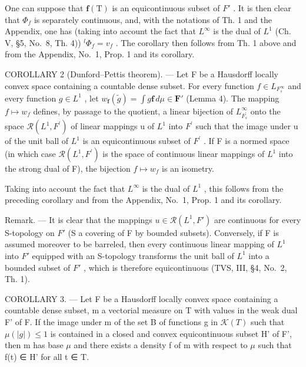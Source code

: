 One can suppose that \(\mathbf{f}(\mathrm{T})\) is an equicontinuous subset of \(F'\) . It is then clear that \(\Phi_{f}\) is separately continuous, and, with the notations of Th. 1 and the Appendix, one has (taking into account the fact that \(L^{\infty}\) is the dual of \(L^{1}\) (Ch. V, §5, No.~8, Th. 4)) \(^{l}\Phi_{f}=v_{f}\) . The corollary then follows from Th. 1 above and from the Appendix, No.~1, Prop. 1 and its corollary.

COROLLARY 2 (Dunford--Pettis theorem). --- Let F be a Hausdorff locally convex space containing a countable dense subset. For every function \(f \in L_{F_{s}^{\infty}}\) and every function \(g \in L^{1}\) , let \(w_{\mathbf{f}}(\widetilde{g}) = \int g\mathbf{f} \, d\mu \in \mathbf{F}'\) (Lemma 4). The mapping \(f \mapsto w_{f}\) defines, by passage to the quotient, a linear bijection of \(L_{F_{s}^{\prime}}^{\infty}\) onto the space \(\mathcal{R}(L^{1}, F^{\prime})\) of linear mappings u of \(L^{1}\) into \(F^{\prime}\) such that the image under u of the unit ball of \(L^{1}\) is an equicontinuous subset of \(F^{\prime}\) . If F is a normed space (in which case \(\mathcal{R}(L^{1}, F^{\prime})\) is the space of continuous linear mappings of \(L^{1}\) into the strong dual of F), the bijection \(f \mapsto w_{f}\) is an isometry.

Taking into account the fact that \(L^{\infty}\) is the dual of \(L^{1}\) , this follows from the preceding corollary and from the Appendix, No.~1, Prop. 1 and its corollary.

Remark. --- It is clear that the mappings \(u \in \mathcal{R}(L^{1}, F')\) are continuous for every S-topology on \(F'\) (S a covering of F by bounded subsets). Conversely, if F is assumed moreover to be barreled, then every continuous linear mapping of \(L^{1}\) into \(F'\) equipped with an S-topology transforms the unit ball of \(L^{1}\) into a bounded subset of \(F'\) , which is therefore equicontinuous (TVS, III, §4, No.~2, Th. 1).

COROLLARY 3. --- Let F be a Hausdorff locally convex space containing a countable dense subset, m a vectorial measure on T with values in the weak dual F' of F. If the image under m of the set B of functions g in \(\mathcal{K}(T)\) such that \(\mu(|g|) \leqslant 1\) is contained in a closed and convex equicontinuous subset H' of F', then m has base \(\mu\) and there exists a density f of m with respect to \(\mu\) such that f(t) ∈ H' for all t ∈ T.

